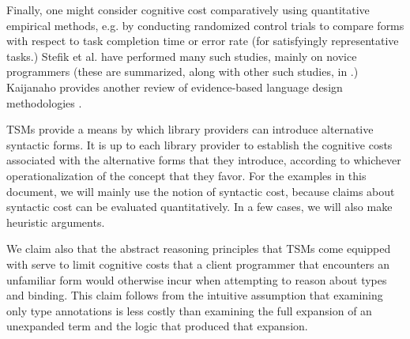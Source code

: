 Finally, one might consider cognitive cost comparatively using quantitative empirical methods, e.g. by conducting randomized control trials to compare forms with respect to task completion time or error rate (for satisfyingly representative tasks.) Stefik et al. have performed many such studies, mainly on novice programmers (these are summarized, along with other such studies, in \cite{journals/jeric/StefikS13}.) Kaijanaho provides another review of evidence-based language design methodologies \cite{kaijanaho2015evidence}.

TSMs provide a means by which library providers can introduce alternative syntactic forms. It is up to each library provider to establish the cognitive costs associated with the alternative forms that they introduce, according to whichever operationalization of the concept that they favor. For the examples in this document, we will mainly use the notion of syntactic cost, because claims about syntactic cost can be evaluated quantitatively. In a few cases, we will also make heuristic arguments. 

We claim also that the abstract reasoning principles that TSMs come equipped with serve to limit cognitive costs that a client programmer that encounters an unfamiliar form would otherwise incur when attempting to reason about types and binding. This claim follows from the intuitive assumption that examining only type annotations is less costly than examining the full expansion of an unexpanded term and the logic that produced that expansion. 




